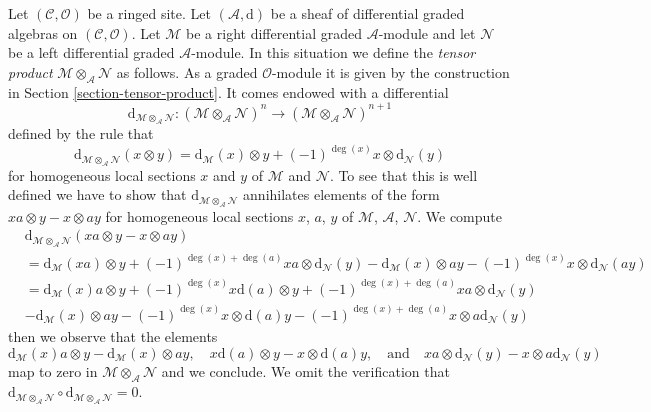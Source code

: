 \documentclass{stacks-project}
\theoremstyle{plain}
\theoremstyle{definition}
\theoremstyle{remark}
\numberwithin{equation}{subsection}
\begin{document}
\medskip\noindent
Let $(\mathcal{C}, \mathcal{O})$ be a ringed site. Let
$(\mathcal{A}, \text{d})$
be a sheaf of differential graded algebras on $(\mathcal{C}, \mathcal{O})$.
Let $\mathcal{M}$ be a right differential graded $\mathcal{A}$-module
and let $\mathcal{N}$ be a left differential graded $\mathcal{A}$-module.
In this situation we define the {\it tensor product}
$\mathcal{M} \otimes_\mathcal{A} \mathcal{N}$ as follows.
As a graded $\mathcal{O}$-module it is given by the construction
in Section \ref{section-tensor-product}. It comes endowed
with a differential
$$
\text{d}_{\mathcal{M} \otimes_\mathcal{A} \mathcal{N}} :
(\mathcal{M} \otimes_\mathcal{A} \mathcal{N})^n
\longrightarrow
(\mathcal{M} \otimes_\mathcal{A} \mathcal{N})^{n + 1}
$$
defined by the rule that
$$
\text{d}_{\mathcal{M} \otimes_\mathcal{A} \mathcal{N}}(x \otimes y) =
\text{d}_\mathcal{M}(x) \otimes y +
(-1)^{\deg(x)}x \otimes \text{d}_\mathcal{N}(y)
$$
for homogeneous local sections $x$ and $y$ of $\mathcal{M}$ and $\mathcal{N}$.
To see that this is well defined we have to show that
$\text{d}_{\mathcal{M} \otimes_\mathcal{A} \mathcal{N}}$ annihilates
elements of the form $xa \otimes y - x \otimes ay$ for homogeneous
local sections $x$, $a$, $y$ of $\mathcal{M}$, $\mathcal{A}$, $\mathcal{N}$.
We compute
\begin{align*}
&
\text{d}_{\mathcal{M} \otimes_\mathcal{A} \mathcal{N}}(
xa \otimes y - x \otimes ay) \\
& =
\text{d}_\mathcal{M}(xa) \otimes y + (-1)^{\deg(x) + \deg(a)}
xa \otimes \text{d}_\mathcal{N}(y)
-\text{d}_\mathcal{M}(x) \otimes ay - (-1)^{\deg(x)}
x \otimes \text{d}_\mathcal{N}(ay) \\
& =
\text{d}_\mathcal{M}(x)a \otimes y + (-1)^{\deg(x)}x\text{d}(a) \otimes y
+ (-1)^{\deg(x) + \deg(a)} xa \otimes \text{d}_\mathcal{N}(y) \\
&
-\text{d}_\mathcal{M}(x) \otimes ay - (-1)^{\deg(x)}
x \otimes \text{d}(a)y - (-1)^{\deg(x) +
\deg(a)} x\otimes a\text{d}_\mathcal{N}(y)
\end{align*}
then we observe that the elements
$$
\text{d}_\mathcal{M}(x)a \otimes y - \text{d}_\mathcal{M}(x) \otimes ay,\quad
x\text{d}(a) \otimes y - x \otimes \text{d}(a)y,\quad
\text{and}\quad
xa \otimes \text{d}_\mathcal{N}(y) - x\otimes a\text{d}_\mathcal{N}(y)
$$
map to zero in $\mathcal{M} \otimes_\mathcal{A} \mathcal{N}$
and we conclude. We omit the verification that
$\text{d}_{\mathcal{M} \otimes_\mathcal{A} \mathcal{N}} \circ
\text{d}_{\mathcal{M} \otimes_\mathcal{A} \mathcal{N}} = 0$.
\end{document}
